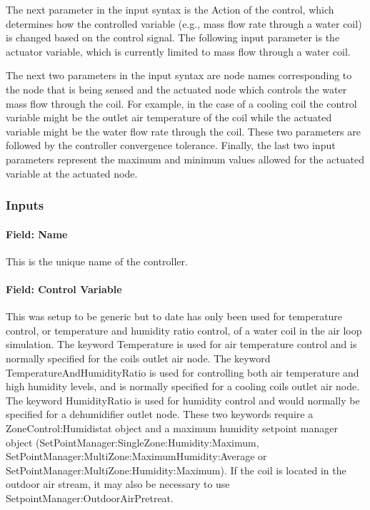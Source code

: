 The next parameter in the input syntax is the Action of the control, which determines how the controlled variable (e.g., mass flow rate through a water coil) is changed based on the control signal. The following input parameter is the actuator variable, which is currently limited to mass flow through a water coil.

The next two parameters in the input syntax are node names corresponding to the node that is being sensed and the actuated node which controls the water mass flow through the coil. For example, in the case of a cooling coil the control variable might be the outlet air temperature of the coil while the actuated variable might be the water flow rate through the coil. These two parameters are followed by the controller convergence tolerance. Finally, the last two input parameters represent the maximum and minimum values allowed for the actuated variable at the actuated node.

\subsubsection{Inputs}\label{inputs-008}

\paragraph{Field: Name}\label{field-name-007}

This is the unique name of the controller.

\paragraph{Field: Control Variable}\label{field-control-variable}

This was setup to be generic but to date has only been used for temperature control, or temperature and humidity ratio control, of a water coil in the air loop simulation. The keyword Temperature is used for air temperature control and is normally specified for the coils outlet air node. The keyword TemperatureAndHumidityRatio is used for controlling both air temperature and high humidity levels, and is normally specified for a cooling coils outlet air node. The keyword HumidityRatio is used for humidity control and would normally be specified for a dehumidifier outlet node. These two keywords require a ZoneControl:Humidistat object and a maximum humidity setpoint manager object (SetPointManager:SingleZone:Humidity:Maximum, SetPointManager:MultiZone:MaximumHumidity:Average or SetPointManager:MultiZone:Humidity:Maximum). If the coil is located in the outdoor air stream, it may also be necessary to use SetpointManager:OutdoorAirPretreat.

